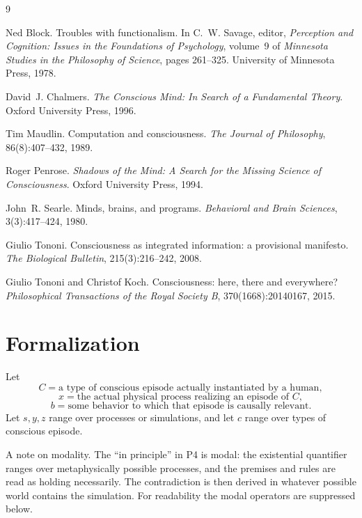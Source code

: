 \documentclass[11pt]{article}
\begin{document}
\begin{thebibliography}{9}

  Ned Block.
  Troubles with functionalism.
  In C.~W. Savage, editor, \emph{Perception and Cognition: Issues in the
    Foundations of Psychology}, volume~9 of \emph{Minnesota Studies in the
    Philosophy of Science}, pages 261--325. University of Minnesota Press,
  1978.

  David~J. Chalmers.
  \emph{The Conscious Mind: In Search of a Fundamental Theory}.
  Oxford University Press, 1996.

  Tim Maudlin.
  Computation and consciousness.
  \emph{The Journal of Philosophy}, 86(8):407--432, 1989.

  Roger Penrose.
  \emph{Shadows of the Mind: A Search for the Missing Science of
    Consciousness}.
  Oxford University Press, 1994.

  John~R. Searle.
  Minds, brains, and programs.
  \emph{Behavioral and Brain Sciences}, 3(3):417--424, 1980.

  Giulio Tononi.
  Consciousness as integrated information: a provisional manifesto.
  \emph{The Biological Bulletin}, 215(3):216--242, 2008.

  Giulio Tononi and Christof Koch.
  Consciousness: here, there and everywhere?
  \emph{Philosophical Transactions of the Royal Society B},
  370(1668):20140167, 2015.

\end{thebibliography}

\appendix

\section{Formalization}
\label{app:formal}

Let
\[
  C = \text{a type of conscious episode actually instantiated by a human},
\]
\[
  x = \text{the actual physical process realizing an episode of } C,
\]
\[
  b = \text{some behavior to which that episode is causally relevant}.
\]
Let \(s,y,z\) range over processes or simulations, and let \(c\) range over
types of conscious episode.

A note on modality. The ``in principle'' in P4 is modal: the existential
quantifier ranges over metaphysically possible processes, and the premises and
rules are read as holding necessarily. The contradiction is then derived in
whatever possible world contains the simulation. For readability the modal
operators are suppressed below.
\end{document}
